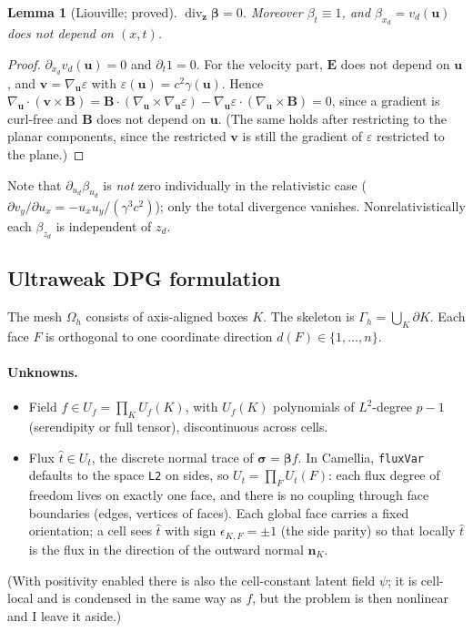 \documentclass[11pt]{article}
\newtheorem{lemma}[proposition]{Lemma}
\theoremstyle{remark}
\theoremstyle{definition}
\newcommand{\bbeta}{\boldsymbol{\beta}}
\newcommand{\bn}{\boldsymbol{n}}
\newcommand{\bz}{\boldsymbol{z}}
\newcommand{\bu}{\boldsymbol{u}}
\newcommand{\bv}{\boldsymbol{v}}
\newcommand{\bE}{\boldsymbol{E}}
\newcommand{\bB}{\boldsymbol{B}}
\newcommand{\bsigma}{\boldsymbol{\sigma}}
\newcommand{\that}{\hat{t}}
\DeclareMathOperator{\divz}{div}
\begin{document}
\begin{lemma}[Liouville; proved]\label{lem:div}
$\divz_{\bz}\bbeta = 0$.  Moreover $\beta_t\equiv 1$, and $\beta_{x_d}=v_d(\bu)$ does not depend on $(x,t)$.
\end{lemma}
\begin{proof}
$\partial_{x_d} v_d(\bu)=0$ and $\partial_t 1 = 0$.  For the velocity part, $\bE$ does not depend on $\bu$, and
$\bv = \nabla_{\bu}\varepsilon$ with $\varepsilon(\bu)=c^2\gamma(\bu)$.  Hence
$\nabla_{\bu}\cdot(\bv\times\bB) = \bB\cdot(\nabla_{\bu}\times\nabla_{\bu}\varepsilon)
 - \nabla_{\bu}\varepsilon\cdot(\nabla_{\bu}\times\bB) = 0$, since a gradient is curl-free and $\bB$ does not
depend on $\bu$.  (The same holds after restricting to the planar components, since the restricted $\bv$ is still the
gradient of $\varepsilon$ restricted to the plane.)
\end{proof}

Note that $\partial_{u_d}\beta_{u_d}$ is \emph{not} zero individually in the relativistic case ($\partial v_y/\partial
u_x = -u_x u_y/(\gamma^3c^2)$); only the total divergence vanishes.  Nonrelativistically each $\beta_{z_d}$ is
independent of $z_d$.

\subsection{Ultraweak DPG formulation}

The mesh $\Omega_h$ consists of axis-aligned boxes $K$.  The skeleton is $\Gamma_h=\bigcup_K\partial K$.  Each face
$F$ is orthogonal to one coordinate direction $d(F)\in\{1,\dots,n\}$.

\paragraph{Unknowns.}
\begin{itemize}[nosep]
  \item Field $f\in U_f = \prod_K U_f(K)$, with $U_f(K)$ polynomials of $L^2$-degree $p-1$ (serendipity or full
        tensor), discontinuous across cells.
  \item Flux $\that\in U_t$, the discrete normal trace of $\bsigma=\bbeta f$.  In Camellia, \texttt{fluxVar} defaults
        to the space \texttt{L2} on sides, so $U_t=\prod_F U_t(F)$: each flux degree of freedom lives on exactly one
        face, and there is no coupling through face boundaries (edges, vertices of faces).  Each global face carries
        a fixed orientation; a cell sees $\that$ with sign $\epsilon_{K,F}=\pm1$ (the side parity) so that locally
        $\that$ is the flux in the direction of the outward normal $\bn_K$.
\end{itemize}
(With positivity enabled there is also the cell-constant latent field $\psi$; it is cell-local and is condensed in the
same way as $f$, but the problem is then nonlinear and I leave it aside.)
\end{document}
